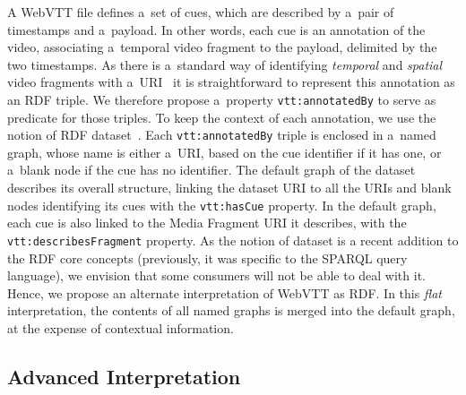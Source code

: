 \documentclass{sig-alternate}
\newcommand{\vtt}[1]{\texttt{vtt:#1}}
\begin{document}
A WebVTT file defines a~set of cues,
which are described by a~pair of timestamps and a~payload.
In other words, each cue is an annotation of the video,
associating a~temporal video fragment to the payload,
delimited by the two timestamps.
As there is a~standard way of identifying \emph{temporal}
and \emph{spatial} video fragments
with a~URI~\cite{troncy2012mediafragments}
it is straightforward to represent this annotation as an RDF triple.
We therefore propose a~property \vtt{annotatedBy}
to serve as predicate for those triples.
To keep the context of each annotation,
we use the notion of RDF dataset~\cite{cyganiak2014rdf11concepts}.
Each \vtt{annotatedBy} triple is enclosed in a~named graph,
whose name is either a~URI, based on the cue identifier if it has one,
or a~blank node if the cue has no identifier.
The default graph of the dataset describes its overall structure,
linking the dataset URI to all the URIs and blank nodes identifying its cues
with the \vtt{hasCue} property.
In the default graph, each cue is also linked to
the Media Fragment URI it describes,
with the \vtt{describesFragment} property. 
As the notion of dataset is a recent addition to the RDF core concepts
(previously, it was specific to the SPARQL query language),
we envision that some consumers will not be able to deal with it.
Hence, we propose an alternate interpretation of WebVTT as RDF.
In this \emph{flat} interpretation,
the contents of all named graphs is merged into the default graph,
at the expense of contextual information.

\subsection{Advanced Interpretation}
\end{document}
